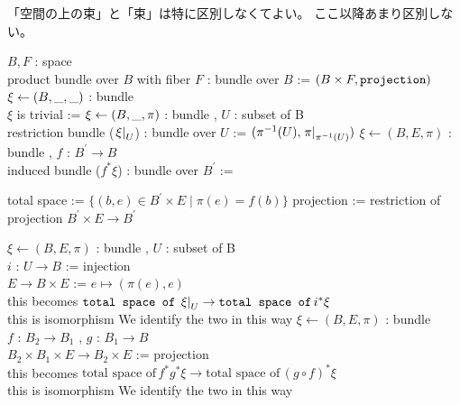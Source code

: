 \begin{Remark}
「空間の上の束」と「束」は特に区別しなくてよい。
ここ以降あまり区別しない。
\end{Remark}

\begin{Definition}
\itemdefi
  \For \(B , F\) : space \\
  \Define product bundle over \(B\) with fiber \(F\) : bundle over \(B\) := \((B \times F , \texttt{projection})\)
\itemdefi
  \For \(\xi \leftarrow (B , \_ , \_)\) : bundle \\
  \Define \(\xi\) is trivial := 
\itemdefi
  \For \(\xi \leftarrow (B , \_ , \pi)\) : bundle , \(U\) : subset of B \\
  \Define restriction bundle (\(\left. {\xi} \right| _{U}\)) : bundle over \(U\) := \((\pi^{-1}(U) , \left. {\pi} \right| _{\pi^{-1}(U)})\)
\itemdefi
  \For \(\xi \leftarrow (B , E , \pi)\) : bundle , \(f\) : \(B^{\prime} \to B\) \\
  \Define induced bundle (\(f^*\xi\)) : bundle over \(B^{\prime}\) :=
  \begin{itemize}
    \itemenum total space := \(\{(b , e) \in B^{\prime} \times E \mid \pi(e) = f(b)\}\)
    \itemenum projection := restriction of projection \(B^{\prime} \times E \to B^{\prime}\)
  \end{itemize}
\end{Definition}

\begin{Theorem}
\itemprop
  \For \(\xi \leftarrow (B , E ,\pi)\) : bundle , \(U\) : subset of B \\
  \Let \(i\) : \(U \to B\) := injection \\
  \Let \(E \to B \times E\) := \(e \mapsto (\pi(e) , e)\) \\
  \Then this becomes \(\texttt{total space of} \, \left. {\xi} \right| _{U} \to \texttt{total space of} \, i^*\xi\) \\
  \Then this is isomorphism
\itemnote
  We identify the two in this way
\itemprop
  \For \(\xi \leftarrow (B , E , \pi)\) : bundle \\
  \For \(f\) : \(B_2 \to B_1\) , \(g\) : \(B_1 \to B\) \\
  \Let \(B_2 \times B_1 \times E \to B_2 \times E\) := projection \\
  \Then this becomes \(\text{total space of} \, f^*g^* \xi \to \text{total space of} \, (g \circ f)^* \xi\) \\
  \Then this is isomorphism
\itemnote
  We identify the two in this way 
\end{Theorem}

